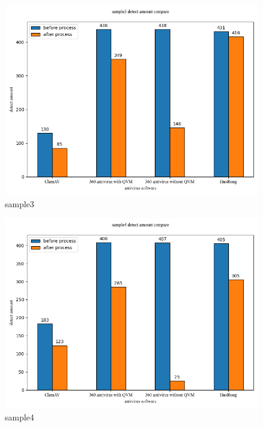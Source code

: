 \begin{figure}[htbp]
  \includegraphics[scale=0.60]{images/sample3.png}
  \caption{sample3}\label{fig:sample3}
\end{figure}
\begin{figure}[htbp]
  \includegraphics[scale=0.60]{images/sample4.png}
  \caption{sample4}\label{fig:sample4}
\end{figure}
